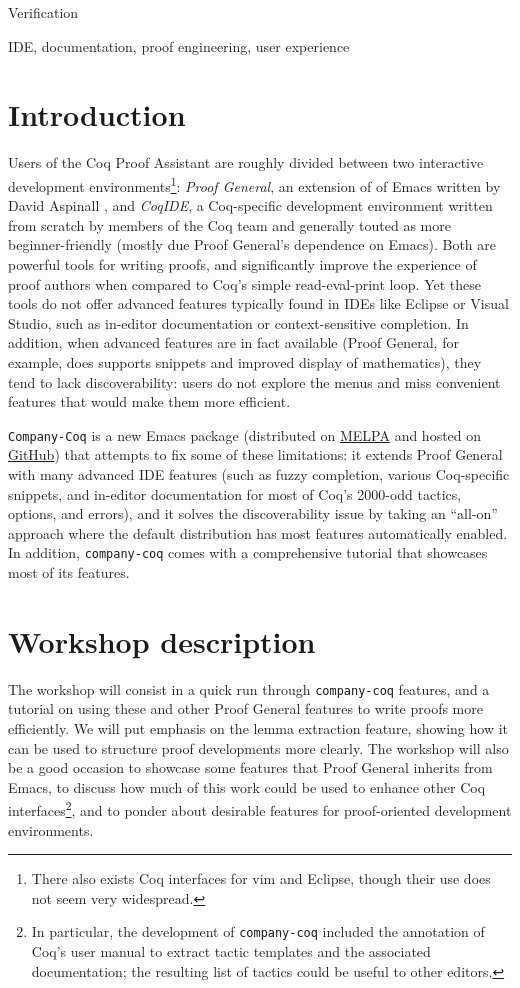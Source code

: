 \documentclass[preprint]{sigplanconf}
\newcommand{\proofg}{Proof General\xspace}
\begin{document}
\terms Verification

\keywords IDE, documentation, proof engineering, user experience

\section*{Introduction}

Users of the Coq Proof Assistant \cite{Coq} are roughly divided between two interactive development environments\footnote{There also exists Coq interfaces for vim and Eclipse, though their use does not seem very widespread.}: \emph{\proofg}, an extension of of Emacs written by David Aspinall \cite{ProofGeneral}, and \emph{CoqIDE}, a Coq-specific development environment written from scratch by members of the Coq team and generally touted as more beginner-friendly (mostly due \proofg's dependence on Emacs). Both are powerful tools for writing proofs, and significantly improve the experience of proof authors when compared to Coq's simple read-eval-print loop. Yet these tools do not offer advanced features typically found in IDEs like Eclipse or Visual Studio, such as in-editor documentation or context-sensitive completion. In addition, when advanced features are in fact available (\proofg, for example, does supports snippets and improved display of mathematics), they tend to lack discoverability: users do not explore the menus and miss convenient features that would make them more efficient.

\texttt{Company-Coq} is a new Emacs package (distributed on \href{http://melpa.org/#/company-coq}{MELPA} and hosted on \href{https://github.com/cpitclaudel/company-coq/}{GitHub}) that attempts to fix some of these limitations: it extends \proofg with many advanced IDE features (such as fuzzy completion, various Coq-specific snippets, and in-editor documentation for most of Coq's 2000-odd tactics, options, and errors), and it solves the discoverability issue by taking an ``all-on'' approach where the default distribution has most features automatically enabled. In addition, \texttt{company-coq} comes with a comprehensive tutorial that showcases most of its features.

\section*{Workshop description}

The workshop will consist in a quick run through \texttt{company-coq} features, and a tutorial on using these and other \proofg features to write proofs more efficiently. We will put emphasis on the lemma extraction feature, showing how it can be used to structure proof developments more clearly. The workshop will also be a good occasion to showcase some features that \proofg inherits from Emacs, to discuss how much of this work could be used to enhance other Coq interfaces\footnote{In particular, the development of \texttt{company-coq} included the annotation of Coq's user manual to extract tactic templates and the associated documentation; the resulting list of tactics could be useful to other editors.}, and to ponder about desirable features for proof-oriented development environments.
\end{document}
